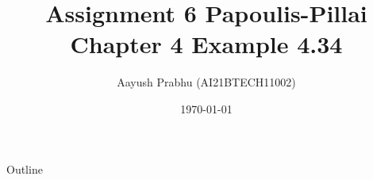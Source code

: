 \documentclass{beamer}
\DeclareMathOperator*{\Res}{Res}
\begin{document}
\newcommand{\BEQA}{\begin{eqnarray}}
\newcommand{\EEQA}{\end{eqnarray}}
\newcommand{\define}{\stackrel{\triangle}{=}}
\newcommand*\circled[1]{\tikz[baseline= (char.base)]{
    \node[shape=circle,draw,inner sep=2pt] (char) {#1};}}

\providecommand{\mbf}{\mathbf}
\providecommand{\pr}[1]{\ensuremath{\Pr\left(#1\right)}}
\providecommand{\qfunc}[1]{\ensuremath{Q\left(#1\right)}}
\providecommand{\sbrak}[1]{\ensuremath{{}\left[#1\right]}}
\providecommand{\lsbrak}[1]{\ensuremath{{}\left[#1\right.]}}
\providecommand{\rsbrak}[1]{\ensuremath{{}\left[#1\right.]}}
\providecommand{\brak}[1]{\ensuremath{\left(#1\right)}}
\providecommand{\lbrak}[1]{\ensuremath{\left(#1\right.)}
\providecommand{\rbrak}[1]{\ensuremath{\left[#1\right.]}}}
\providecommand{\cbrak}[1]{\ensuremath{\left\{#1\right\}}}
\providecommand{\lcbrak}[1]{\ensuremath{\left\{#1\right.}}
\providecommand{\rcbrak}[1]{\ensuremath{\left.#1\right\}}}
\theoremstyle{remark}
\newtheorem{rem}{Remark}
\newcommand{\sgn}{\mathop{\mathrm{sgn}}}
\providecommand{\abs}[1]{\left\vert#1\right\vert}
\providecommand{\res}[1]{\Res\displaylimits_{#1}} 
\providecommand{\norm}[1]{\left\lVert#1\right\rVert}
\providecommand{\mtx}[1]{\mathbf{#1}}
\providecommand{\mean}[1]{E\left[ #1 \right]}
\providecommand{\fourier}{\overset{\mathcal{F}}{ \rightleftharpoons}}
\providecommand{\system}{\overset{\mathcal{H}}{ \longleftrightarrow}}
\newcommand{\cosec}{\,\text{cosec}\,}
\newcommand*{\permcomb}[4][0mu]{{{}^{#3}\mkern#1#2_{#4}}}
\newcommand*{\perm}[1][-3mu]{\permcomb[#1]{P}}
\newcommand*{\comb}[1][-1mu]{\permcomb[#1]{C}}
\renewcommand{\thetable}{\arabic{table}} 
\providecommand{\dec}[2]{\ensuremath{\overset{#1}{\underset{#2}{\gtrless}}}}
\newcommand{\myvec}[1]{\ensuremath{\begin{pmatrix}#1\end{pmatrix}}}
\newcommand{\mydet}[1]{\ensuremath{\begin{vmatrix}#1\end{vmatrix}}}
\makeatletter
{}
\makeatother
\let\StandardTheFigure\thefigure{}
\let\vec\mathbf{}
\title{Assignment 6 Papoulis-Pillai Chapter 4 Example 4.34}
\author{Aayush Prabhu (AI21BTECH11002)}
\date{\today}
\logo{\large \LaTeX}
\begin{frame}
    \titlepage 
  \end{frame}
  \logo{}
  \begin{frame}{Outline}
    \tableofcontents
  \end{frame}
\end{document}
